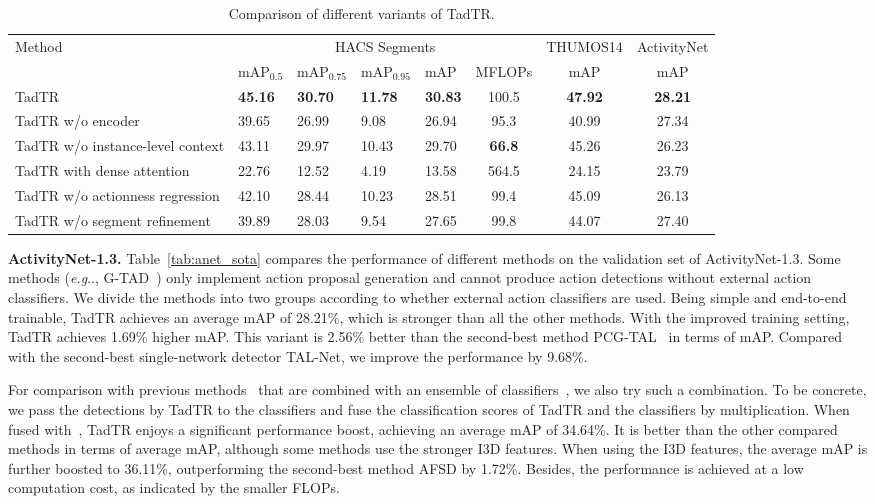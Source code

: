 \documentclass[lettersize,journal]{IEEEtran}
\makeatletter
\DeclareRobustCommand\onedot{\futurelet\@let@token\@onedot}
\def\@onedot{\ifx\@let@token.\else.\null\fi\xspace}
\def\eg{\emph{e.g}\onedot} \def\Eg{\emph{E.g}\onedot}
\makeatother
\begin{document}
\begin{table*}[tb]
\caption{
Comparison of different variants of TadTR.}
\label{tab:hacs_ablation}
\centering
 \begin{tabular}{l|*{4}{p{0.8cm}<{\centering}}c|c|c}
\toprule
\multirow{2}{*}{Method}&\multicolumn{5}{c|}{HACS Segments} & \scriptsize{THUMOS14} & \scriptsize{ActivityNet} \\ \cline{2-6}
&mAP$_{0.5}$&mAP$_{0.75}$ &mAP$_{0.95}$ &mAP&MFLOPs &mAP &mAP\\
\midrule
TadTR  & \textbf{45.16}& \textbf{30.70}& \textbf{11.78}& \textbf{30.83}  &100.5& \textbf{47.92}&\textbf{28.21}\\
TadTR w/o encoder & 39.65 &26.99& 9.08& 26.94& 95.3 &40.99&27.34\\
TadTR    w/o instance-level context & 43.11 &29.97 &10.43& 29.70&\textbf{66.8}&45.26&26.23\\
TadTR with dense attention & 22.76& 12.52& 4.19 &13.58&564.5&24.15&23.79\\
TadTR    w/o actionness regression  & 42.10& 28.44& 10.23& 28.51&99.4 &45.09&26.13\\
TadTR    w/o segment refinement & 39.89& 28.03& 9.54& 27.65&99.8&44.07&27.40 \\
\bottomrule
\end{tabular}
\end{table*}

\vspace{1ex}\noindent\textbf{ActivityNet-1.3.} 
Table~\ref{tab:anet_sota} compares the performance of different methods on the validation set of ActivityNet-1.3. 
Some methods (\eg, G-TAD~\cite{xu2020g}) only implement action proposal generation and cannot produce action detections without external action classifiers. 
We divide the methods into two groups according to whether external action classifiers are used. Being simple and end-to-end trainable, TadTR achieves an average mAP of 28.21\%, which is stronger than all the other methods. With the improved training setting, TadTR achieves 1.69\% higher mAP.  This variant is 2.56\% better than the second-best method PCG-TAL~\cite{su2021pcg} in terms of mAP. Compared with the second-best single-network detector TAL-Net, we improve the performance by 9.68\%.  

For comparison with previous methods~\cite{xu2020g,lin2019bmn,yang2020revisiting} that are combined with an ensemble of classifiers~\cite{zhao2017cuhk}, we also try such a combination. To be concrete, we pass the detections by TadTR to the classifiers and fuse the classification scores of TadTR and the classifiers by multiplication. 
When fused with~\cite{zhao2017temporal}, TadTR enjoys a significant performance boost, achieving an average mAP of 34.64\%. 
It is better than the other compared methods in terms of average mAP, although some methods use the stronger I3D features. When using the I3D features, the average mAP is further boosted to 36.11\%, outperforming the second-best method AFSD by 1.72\%. Besides, the performance is achieved at a low computation cost, as indicated by the smaller FLOPs.
\end{document}
